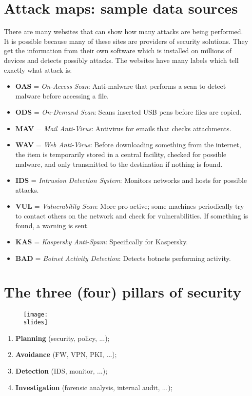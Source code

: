 \section{Attack maps: sample data sources}
There are many websites that can show how many attacks are being performed. It is possible because many of
these sites are providers of security solutions. They get the information from their own software which is
installed on millions of devices and detects possibly attacks. The websites have many labels which tell exactly
what attack is:
\begin{itemize}
  \item \textbf{OAS} = \emph{On-Access Scan}: Anti-malware that performs a scan to detect malware before accessing a file.
  \item \textbf{ODS} = \emph{On-Demand Scan}: Scans inserted USB pens before files are copied.
  \item \textbf{MAV} = \emph{Mail Anti-Virus}: Antivirus for emails that checks attachments.
  \item \textbf{WAV} = \emph{Web Anti-Virus}: Before downloading something from the internet, the item is temporarily stored in a central facility, checked for possible malware, and only transmitted to the destination if nothing is found.
  \item \textbf{IDS} = \emph{Intrusion Detection System}: Monitors networks and hosts for possible attacks.
  \item \textbf{VUL} = \emph{Vulnerability Scan}: More pro-active; some machines periodically try to contact others on the network and check for vulnerabilities. If something is found, a warning is sent.
  \item \textbf{KAS} = \emph{Kaspersky Anti-Spam}: Specifically for Kaspersky.
  \item \textbf{BAD} = \emph{Botnet Activity Detection}: Detects botnets performing activity.
\end{itemize}


\section{The three (four) pillars of security}
\begin{figure}[h]
  \centering
  \texttt{[image: \\slides]}
\end{figure}
\begin{enumerate}
  \item \textbf{Planning} (security, policy, ...);
  \item \textbf{Avoidance} (FW, VPN, PKI, ...);
  \item \textbf{Detection} (IDS, monitor, ...);
  \item \textbf{Investigation} (forensic analysis, internal audit, ...);
\end{enumerate}

